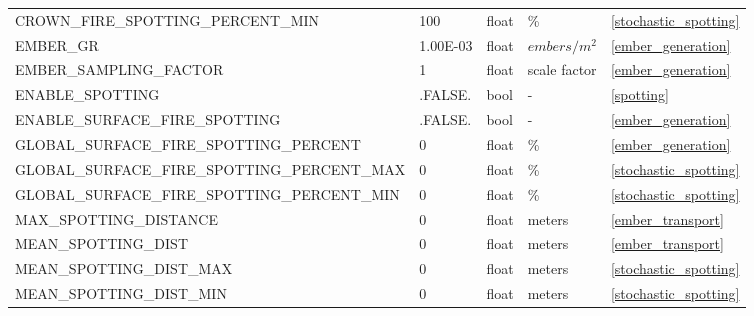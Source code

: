 \begin{landscape}
\begin{center}
\begin{longtable}{lllll}
CROWN\_FIRE\_SPOTTING\_PERCENT\_MIN          & 100                        & float                  & \%                                 & \ref{stochastic_spotting}            \\
EMBER\_GR                                    & 1.00E-03                   & float                  & $embers/m^2$                       & \ref{ember_generation}               \\
EMBER\_SAMPLING\_FACTOR                      & 1                          & float                  & scale factor                       & \ref{ember_generation}               \\
ENABLE\_SPOTTING                             & .FALSE.                    & bool                   & -                                  & \ref{spotting}                       \\
ENABLE\_SURFACE\_FIRE\_SPOTTING              & .FALSE.                    & bool                   & -                                  & \ref{ember_generation}               \\
GLOBAL\_SURFACE\_FIRE\_SPOTTING\_PERCENT     & 0                          & float                  & \%                                 & \ref{ember_generation}               \\
GLOBAL\_SURFACE\_FIRE\_SPOTTING\_PERCENT\_MAX & 0                         & float                  & \%                                 & \ref{stochastic_spotting}            \\
GLOBAL\_SURFACE\_FIRE\_SPOTTING\_PERCENT\_MIN & 0                         & float                  & \%                                 & \ref{stochastic_spotting}            \\
MAX\_SPOTTING\_DISTANCE                      & 0                          & float                  & meters                             & \ref{ember_transport}                \\
MEAN\_SPOTTING\_DIST                         & 0                          & float                  & meters                             & \ref{ember_transport}                \\
MEAN\_SPOTTING\_DIST\_MAX                    & 0                          & float                  & meters                             & \ref{stochastic_spotting}            \\
MEAN\_SPOTTING\_DIST\_MIN                    & 0                          & float                  & meters                             & \ref{stochastic_spotting}            \\

\end{longtable}
\end{center}
\end{landscape}

